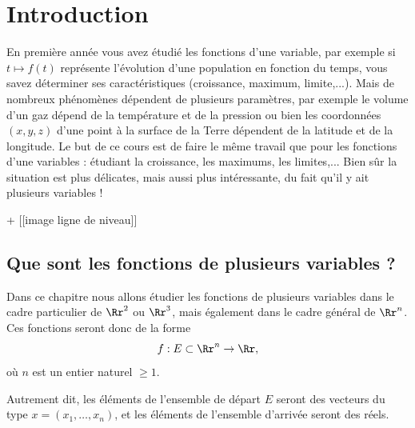 \documentclass[12pt, class=report,crop=false]{standalone}
\begin{document}




\section{Introduction}

En première année vous avez étudié les fonctions d'une variable, par exemple si $t\mapsto f(t)$ représente l'évolution d'une population en fonction du temps, vous savez déterminer ses caractéristiques (croissance, maximum, limite,...). 
Mais de nombreux phénomènes dépendent de plusieurs paramètres, par exemple le volume d'un gaz dépend de la température et de la pression ou bien les coordonnées $(x,y,z)$ d'une point à la surface de la Terre dépendent de la latitude et de la longitude. Le but de ce cours est de faire le même travail que pour les fonctions d'une variables : étudiant la croissance, les maximums, les limites,... Bien sûr la situation est plus délicates, mais aussi plus intéressante, du fait qu'il y ait plusieurs variables !






+ [[image ligne de niveau]]

\subsection{Que sont les fonctions de plusieurs variables ?}

Dans ce chapitre nous allons étudier les fonctions de plusieurs variables dans le cadre particulier de $\Rr^2$ ou $\Rr^3$, mais également dans le cadre général de $\Rr^n$. Ces fonctions seront donc de la forme 
\begin{equation*}
f:E \subset \Rr^n \rightarrow \Rr,
\end{equation*}
où $n$ est un entier naturel $\ge 1$. 

Autrement dit, les éléments de l'ensemble de départ $E$ seront des vecteurs du type $x=(x_1,\ldots,x_n)$, et les éléments de l'ensemble d'arrivée seront des réels.
\end{document}
